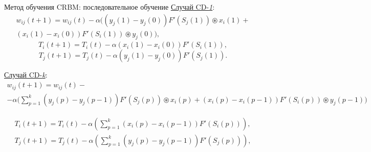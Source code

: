 \documentclass[10pt]{beamer}
\begin{document}
        \begin{frame}{Метод обучения CRBM: последовательное обучение}
            \underline{Случай CD-\textit{1}}:
            \begin{multline*}
                w_{ij}(t+1)=w_{ij}(t)-\alpha((y_j(1)-y_j(0))F'(S_j(1))\circledast x_i(1)+\\(x_i(1)-x_i(0))F'(S_i(1))\circledast y_j(0)),    
            \end{multline*}
            \begin{equation*}
                T_i(t+1)=T_i(t)-\alpha(x_i(1)-x_i(0))F'(S_i(1)),
            \end{equation*}
            \begin{equation*}
                T_j(t+1)=T_j(t)-\alpha(y_j(1)-y_j(0))F'(S_j(1)).  
            \end{equation*}

            \underline{Случай CD-\textit{k}}:
            \begin{multline*}
                w_{ij}(t+1)=w_{ij}(t)-\\-\alpha\Bigg(\sum_{p=1}^k (y_j(p)-y_j(p-1))F'(S_j(p)) \circledast x_i(p) +(x_i(p)-x_i(p-1))F'(S_i(p)) \circledast y_j(p-1)\Bigg)
            \end{multline*}

            \begin{equation*}
            \begin{aligned}
                T_i(t+1)=T_i(t)-\alpha\left(\sum_{p=1}^k (x_i(p)-x_i(p-1))F'(S_i(p))\right),\\
                T_j(t+1)=T_j(t)-\alpha\left(\sum_{p=1}^k (y_j(p)-y_j(p-1))F'(S_j(p))\right),
            \end{aligned}
            \end{equation*}
        \end{frame}
\end{document}
